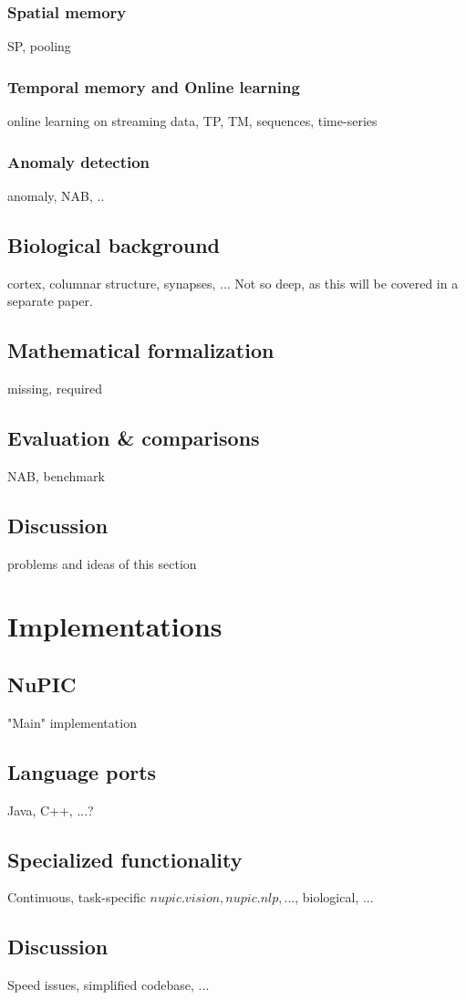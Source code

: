 \documentclass[a4,IEEEconf]{article}
\begin{document}
\subsubsection{Spatial memory}
SP, pooling
\subsubsection{Temporal memory and Online learning}
online learning on streaming data, TP, TM, sequences, time-series
\subsubsection{Anomaly detection}
anomaly, NAB, ..
\subsection{Biological background}
cortex, columnar structure, synapses, ...
Not so deep, as this will be covered in a separate paper.
\subsection{Mathematical formalization}
missing, required
\subsection{Evaluation \& comparisons}
NAB, benchmark
\subsection{Discussion}
problems and ideas of this section

\section{Implementations}
\subsection{NuPIC}
"Main" implementation
\subsection{Language ports}
Java, C++, ...?
\subsection{Specialized functionality}
Continuous, task-specific \(nupic.vision, nupic.nlp,...\), biological, ...
\subsection{Discussion}
Speed issues, simplified codebase, ...
\end{document}
